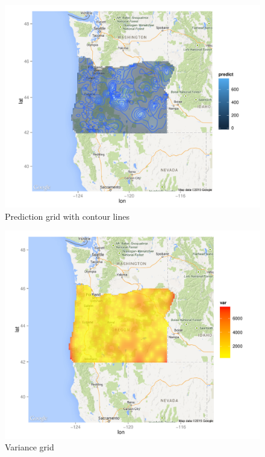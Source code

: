 \documentclass[12pt,twoside]{reedthesis}
\begin{document}
\begin{figure}[h!]
	   
	       \centering
	  
	    \includegraphics[scale=0.7]{contour_plot}
	
	     \caption{Prediction grid with contour lines}
	 \label{contour}
	\end{figure}
	
\begin{figure}[h!]
	   
	       \centering
	  
	    \includegraphics[scale=0.7]{var_plot}
	
	     \caption{Variance grid}
	 \label{var}
	\end{figure}
	
\end{document}
